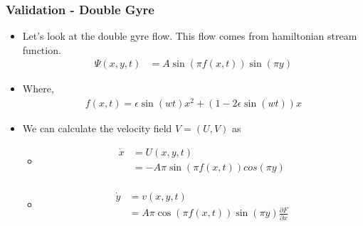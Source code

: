 \documentclass[../presentation.tex]{subfiles}
\begin{document}
\begin{frame}
  \frametitle{Validation - Double Gyre}
  
  \begin{itemize}
    \item Let's look at the double gyre flow. This flow comes from hamiltonian stream function.
    \begin{equation}
      \begin{aligned}
        \Psi(x, y, t) &= A\sin(\pi f(x, t)) \sin(\pi y)
      \end{aligned}
    \end{equation}
    
    \item Where,
    \begin{equation}
      \begin{aligned}
        f(x, t) = \epsilon\sin(wt) x^2 + (1 - 2 \epsilon \sin(wt))x
      \end{aligned}
    \end{equation}


    \item We can calculate the velocity field \(V = (U, V)\) as
    \begin{itemize}
      \item\begin{equation}
        \begin{aligned}
          \dot x &= U(x, y, t) \\
          &= -A\pi\sin(\pi f(x, t)) cos(\pi y) \\
        \end{aligned}
      \end{equation}
      
      \item \begin{equation}
        \begin{aligned}
          \dot y &= v(x, y, t) \\
          &= A\pi\cos(\pi f(x, t)) \sin(\pi y) \frac{\partial F}{\partial x}
        \end{aligned}
      \end{equation}
    \end{itemize}
  \end{itemize}  
\end{frame}
\end{document}
